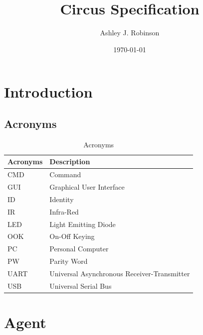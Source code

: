 \documentclass[a4paper]{article}
\title{Circus Specification}
\author{Ashley J. Robinson}
\date{\today}
\begin{document}
\maketitle

\section{Introduction}

   \subsection{Acronyms} 
      \begin{table}[h]
         \centering
         \caption{Acronyms}
         \label{tab_acronyms}
         \begin{tabular}{|l|l|}
            \hline
            \textbf{Acronyms}    &  \textbf{Description}                         \\ \hline  
            CMD                  &  Command                                      \\ \hline
            GUI                  &  Graphical User Interface                     \\ \hline
            ID                   &  Identity                                     \\ \hline
            IR                   &  Infra-Red                                    \\ \hline
            LED                  &  Light Emitting Diode                         \\ \hline
            OOK                  &  On-Off Keying                                \\ \hline
            PC                   &  Personal Computer                            \\ \hline
            PW                   &  Parity Word                                  \\ \hline
            UART                 &  Universal Asynchronous Receiver-Transmitter  \\ \hline  
            USB                  &  Universal Serial Bus                         \\ \hline
         \end{tabular}
\end{table}  


\section{Agent}
\end{document}

